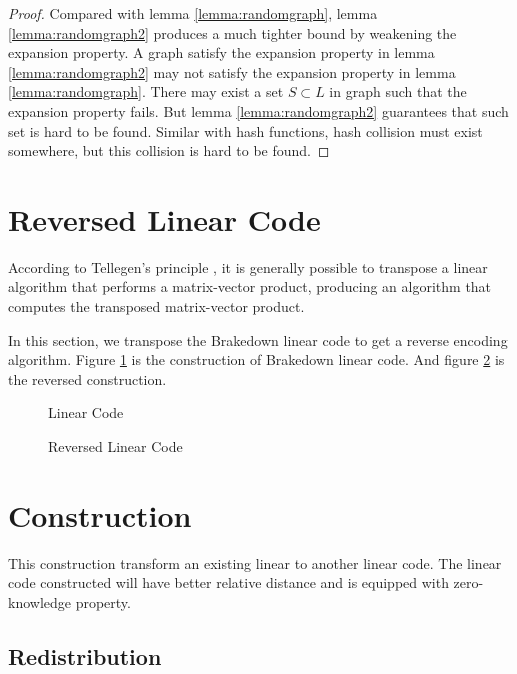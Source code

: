 \begin{proof}
Compared with lemma \ref{lemma:randomgraph}, lemma \ref{lemma:randomgraph2} produces a much tighter bound by weakening the expansion property. A graph satisfy the expansion property in lemma \ref{lemma:randomgraph2} may not satisfy the expansion property in lemma \ref{lemma:randomgraph}. There may exist a set $S \subset L$ in graph such that the expansion property fails. But lemma \ref{lemma:randomgraph2} guarantees that such set is hard to be found. Similar with hash functions, hash collision must exist somewhere, but this collision is hard to be found.

\end{proof}

\section{Reversed Linear Code}

According to Tellegen’s principle \cite{Tellegen}, it is generally possible to transpose a linear algorithm that performs a matrix-vector product, producing an algorithm that computes the transposed matrix-vector product.

In this section, we transpose the Brakedown linear code to get a reverse encoding algorithm. Figure \ref{fig:lc} is the construction of Brakedown linear code. And figure \ref{fig:lc-rev} is the reversed construction.


\begin{figure}[h]
\centering

\caption{Linear Code}
\label{fig:lc}
\end{figure}



\begin{figure}[h]
\centering

\caption{Reversed Linear Code}
\label{fig:lc-rev}
\end{figure}


\section{Construction}

This construction transform an existing linear to another linear code. The linear code constructed will have better relative distance and is equipped with zero-knowledge property.

\subsection{Redistribution}

